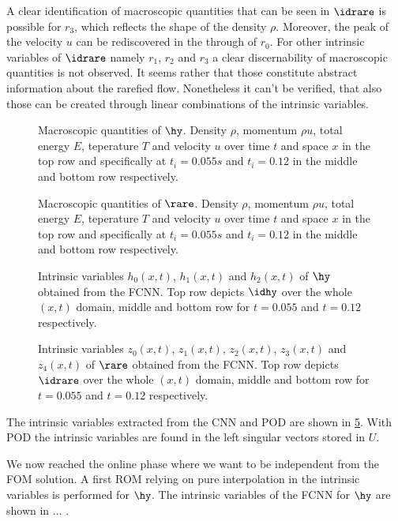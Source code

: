 A clear identification of macroscopic quantities that can be seen in \(\idrare\) is possible for \(r_3\), which reflects the shape of the density \(\rho\). Moreover, the peak of the velocity \(u\) can be rediscovered in the through of \(r_0\). For other intrinsic variables of \(\idrare\) namely \(r_1\), \(r_2\) and \(r_3\) a clear discernability of macroscopic quantities is not observed. It seems rather that those constitute abstract information about the rarefied flow. Nonetheless it can't be verified, that also those can be created through linear combinations of the intrinsic variables.\\
   
\begin{figure}[htp!]
	
	\caption{Macroscopic quantities of \(\hy\). Density \(\rho\), momentum \(\rho u\), total energy \(E\), teperature \(T\) and velocity \(u\) over time \(t\) and space \(x\) in the top row and specifically at \(t_i=0.055s\) and \(t_i=0.12\) in the middle and bottom row respectively.}
	\label{Fig: Macro_hy}
\end{figure}
\begin{figure}[hbp!]
	
		\caption{Macroscopic quantities of \(\rare\). Density \(\rho\), momentum \(\rho u\), total energy \(E\), teperature \(T\) and velocity \(u\) over time \(t\) and space \(x\) in the top row and specifically at \(t_i=0.055s\) and \(t_i=0.12\) in the middle and bottom row respectively.}
	\label{Fig: Macro_rare}
\end{figure}
\begin{figure}[htp!]
	\centering
	
	\caption{Intrinsic variables \(h_0(x,t)\), \(h_1(x,t)\) and \(h_2(x,t)\) of \(\hy\) obtained from the FCNN. Top row depicts \(\idhy\) over the whole \((x,t)\) domain, middle and bottom row for \(t=0.055\) and \(t=0.12\) respectively.}
	\label{Fig: Code_hy}
\end{figure}
\begin{figure}[hbp!]
	
	\caption{Intrinsic variables \(z_0(x,t)\), \(z_1(x,t)\), \(z_2(x,t)\), \(z_3(x,t)\) and \(z_4(x,t)\) of \(\rare\) obtained from the FCNN. Top row depicts \(\idrare\) over the whole \((x,t)\) domain, middle and bottom row for \(t=0.055\) and \(t=0.12\) respectively.}
	\label{Fig: Code_rare}
\end{figure}
The intrinsic variables extracted from the CNN and POD are shown in \cref{Fig: CNNPOD}. With POD the intrinsic variables are found in the left singular vectors stored in \(U\).  
\begin{figure}
	
	\caption{}
	\label{Fig: CNNPOD}
\end{figure}
We now reached the online phase where we want to be independent from the FOM solution. A first ROM relying on pure interpolation in the intrinsic variables is performed for \(\hy\). The intrinsic variables of the FCNN for \(\hy\) are shown in ... . 


